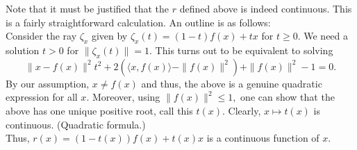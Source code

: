 \documentclass[12pt]{article}
\theoremstyle{definition}
\numberwithin{thm}{section}
\begin{document}
Note that it must be justified that the $r$ defined above is indeed continuous. This is a fairly straightforward calculation. An outline is as follows:\\
Consider the ray $\zeta_x$ given by $\zeta_x(t) = (1 - t)f(x) + tx$ for $t \ge 0.$ We need a solution $t > 0$ for $\|\zeta_x(t)\| = 1.$ This turns out to be equivalent to solving
\begin{equation*} 
	\|x - f(x)\|^2 t^2 + 2(\langle x, f(x)\rangle - \|f(x)\|^2) + \|f(x)\|^2 - 1 = 0.
\end{equation*} 
By our assumption, $x \neq f(x)$ and thus, the above is a genuine quadratic expression for all $x.$ Moreover, using $\|f(x)\|^2 \le 1,$ one can show that the above has one unique positive root, call this $t(x).$ Clearly, $x \mapsto t(x)$ is continuous. (Quadratic formula.)\\
Thus, $r(x) = (1 - t(x))f(x) + t(x)x$ is a continuous function of $x.$
\end{document}
